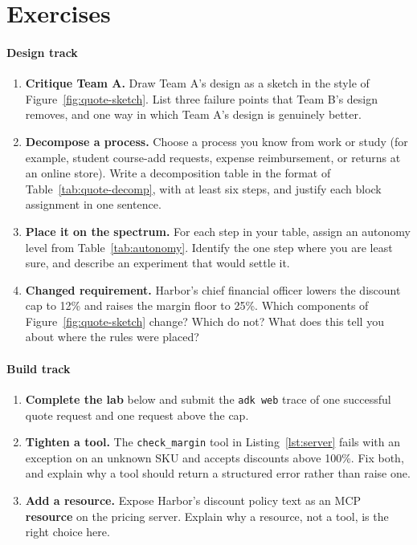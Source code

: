 \section*{Exercises}

\paragraph{Design track}
\begin{enumerate}[itemsep=2pt]
  \item \textbf{Critique Team A.} Draw Team A's design as a sketch in the style of Figure~\ref{fig:quote-sketch}. List three failure points that Team B's design removes, and one way in which Team A's design is genuinely better.
  \item \textbf{Decompose a process.} Choose a process you know from work or study (for example, student course-add requests, expense reimbursement, or returns at an online store). Write a decomposition table in the format of Table~\ref{tab:quote-decomp}, with at least six steps, and justify each block assignment in one sentence.
  \item \textbf{Place it on the spectrum.} For each step in your table, assign an autonomy level from Table~\ref{tab:autonomy}. Identify the one step where you are least sure, and describe an experiment that would settle it.
  \item \textbf{Changed requirement.} Harbor's chief financial officer lowers the discount cap to 12\% and raises the margin floor to 25\%. Which components of Figure~\ref{fig:quote-sketch} change? Which do not? What does this tell you about where the rules were placed?
\end{enumerate}

\paragraph{Build track}
\begin{enumerate}[resume, itemsep=2pt]
  \item \textbf{Complete the lab} below and submit the \texttt{adk web} trace of one successful quote request and one request above the cap.
  \item \textbf{Tighten a tool.} The \texttt{check\_margin} tool in Listing~\ref{lst:server} fails with an exception on an unknown SKU and accepts discounts above 100\%. Fix both, and explain why a tool should return a structured error rather than raise one.
  \item \textbf{Add a resource.} Expose Harbor's discount policy text as an MCP \textbf{resource} on the pricing server. Explain why a resource, not a tool, is the right choice here.
\end{enumerate}

